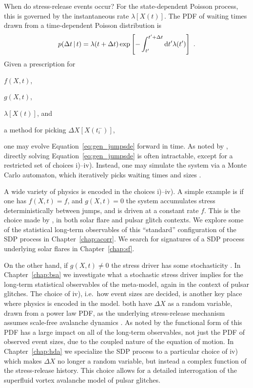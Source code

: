When do stress-release events occur? For the state-dependent Poisson process, this is governed by the instantaneous rate $\lambda[X(t)]$. The PDF of waiting times drawn from a time-dependent Poisson distribution is \citep{Cox1955}
\begin{equation}
    p(\Delta t\, |\, t) = \lambda(t + \Delta t) \exp \left[-\int_{t'}^{t' + \Delta t}\textrm{d} t' \lambda(t')\right]\ . \label{eq:gen_tdp_wt}
\end{equation}
Given a prescription for \begin{enumerate*}\item $f(X, t)$, \item $g(X, t)$, \item $\lambda[X(t)]$, and \item a method for picking $\Delta X[X(t_i^-)]$,\end{enumerate*} one may evolve Equation~\eqref{eq:gen_jumpsde} forward in time. As noted by \citet{Wheatland2009,Fulgenzi2017}, directly solving Equation~\eqref{eq:gen_jumpsde} is often intractable, except for a restricted set of choices i)--iv). Instead, one may simulate the system via a Monte Carlo automaton, which iteratively picks waiting times and sizes \citep{Wheatland2009,Fulgenzi2017,Carlin2019quasi}. 

A wide variety of physics is encoded in the choices i)--iv). A simple example is if one has $f(X, t) = f$, and $g(X, t) = 0$ the system accumulates stress deterministically between jumps, and is driven at a constant rate $f$. This is the choice made by \citet{Wheatland2008,Wheatland2009,Fulgenzi2017,Carlin2019quasi,Carlin2019ac,Carlin2021endog,Carlin2023sf}, in both solar flare and pulsar glitch contexts. We explore some of the statistical long-term observables of this ``standard'' configuration of the SDP process in Chapter~\ref{chap:acorr}. We search for signatures of a SDP process underlying solar flares in Chapter~\ref{chap:sf}. 

On the other hand, if $g(X, t) \neq 0$ the stress driver has some stochasticity \citep{Daly2006,Daly2007,Carlin2020bsa}. In Chapter~\ref{chap:bsa} we investigate what a stochastic stress driver implies for the long-term statistical observables of the meta-model, again in the context of pulsar glitches. The choice of iv), i.e.~how event sizes are decided, is another key place where physics is encoded in the model. \citet{Wheatland2009,Fulgenzi2017} both have $\Delta X$ as a random variable, drawn from a power law PDF, as the underlying stress-release mechanism assumes scale-free avalanche dynamics \citep{Jensen1998}. As noted by \citet{Carlin2019quasi} the functional form of this PDF has a large impact on all of the long-term observables, not just the PDF of observed event sizes, due to the coupled nature of the equation of motion. In Chapter~\ref{chap:hda} we specialize the SDP process to a particular choice of iv) which makes $\Delta X$ no longer a random variable, but instead a complex function of the stress-release history. This choice allows for a detailed interrogation of the superfluid vortex avalanche model of pulsar glitches.

